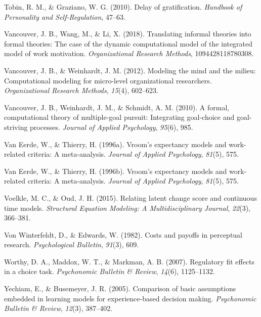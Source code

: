 \documentclass[english,,man]{apa6}
\theoremstyle{definition}
\theoremstyle{definition}
\theoremstyle{definition}
\theoremstyle{remark}
\begin{document}
\leavevmode\hypertarget{ref-tobin2010}{}%
Tobin, R. M., \& Graziano, W. G. (2010). Delay of gratification.
\emph{Handbook of Personality and Self-Regulation}, 47--63.

\leavevmode\hypertarget{ref-vancouver2018}{}%
Vancouver, J. B., Wang, M., \& Li, X. (2018). Translating informal
theories into formal theories: The case of the dynamic computational
model of the integrated model of work motivation. \emph{Organizational
Research Methods}, 1094428118780308.

\leavevmode\hypertarget{ref-vancouver2012}{}%
Vancouver, J. B., \& Weinhardt, J. M. (2012). Modeling the mind and the
milieu: Computational modeling for micro-level organizational
researchers. \emph{Organizational Research Methods}, \emph{15}(4),
602--623.

\leavevmode\hypertarget{ref-vancouver2010}{}%
Vancouver, J. B., Weinhardt, J. M., \& Schmidt, A. M. (2010). A formal,
computational theory of multiple-goal pursuit: Integrating goal-choice
and goal-striving processes. \emph{Journal of Applied Psychology},
\emph{95}(6), 985.

\leavevmode\hypertarget{ref-van1996}{}%
Van Eerde, W., \& Thierry, H. (1996a). Vroom's expectancy models and
work-related criteria: A meta-analysis. \emph{Journal of Applied
Psychology}, \emph{81}(5), 575.

\leavevmode\hypertarget{ref-vaneerde1996}{}%
Van Eerde, W., \& Thierry, H. (1996b). Vroom's expectancy models and
work-related criteria: A meta-analysis. \emph{Journal of Applied
Psychology}, \emph{81}(5), 575.

\leavevmode\hypertarget{ref-voelkle2015relating}{}%
Voelkle, M. C., \& Oud, J. H. (2015). Relating latent change score and
continuous time models. \emph{Structural Equation Modeling: A
Multidisciplinary Journal}, \emph{22}(3), 366--381.

\leavevmode\hypertarget{ref-von1982}{}%
Von Winterfeldt, D., \& Edwards, W. (1982). Costs and payoffs in
perceptual research. \emph{Psychological Bulletin}, \emph{91}(3), 609.

\leavevmode\hypertarget{ref-worthy2007}{}%
Worthy, D. A., Maddox, W. T., \& Markman, A. B. (2007). Regulatory fit
effects in a choice task. \emph{Psychonomic Bulletin \& Review},
\emph{14}(6), 1125--1132.

\leavevmode\hypertarget{ref-yechiam2005}{}%
Yechiam, E., \& Busemeyer, J. R. (2005). Comparison of basic assumptions
embedded in learning models for experience-based decision making.
\emph{Psychonomic Bulletin \& Review}, \emph{12}(3), 387--402.
\end{document}
